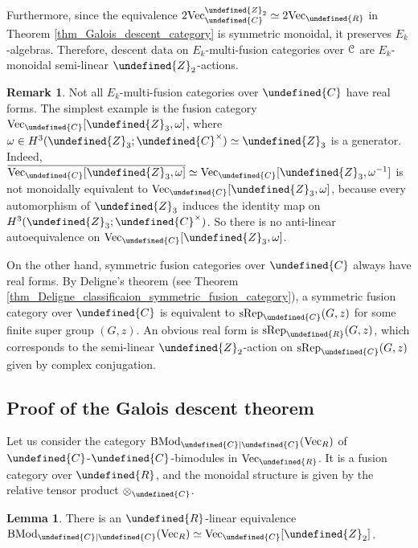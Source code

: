 \documentclass[10pt]{article}
\let\mathbb\undefined
\theoremstyle{definition}
\newtheorem{lem}[thm]{Lemma}
\newtheorem{rem}[thm]{Remark}
\numberwithin{equation}{section}
\numberwithin{thm}{section}
\newcommand{\Cb}{\mathbb{C}}
\newcommand{\Rb}{\mathbb{R}}
\newcommand{\Zb}{\mathbb{Z}}
\newcommand{\CC}{\EuScript{C}}
\DeclareMathOperator{\BMod}{BMod}
\newcommand{\vect}{\mathrm{Vec}}
\newcommand{\srep}{\mathrm{sRep}}
\begin{document}
Furthermore, since the equivalence $2\vect_\Cb^{\Zb_2} \simeq 2\vect_\Rb$ in Theorem \ref{thm_Galois_descent_category} is symmetric monoidal, it preserves $E_k$-algebras. Therefore, descent data on $E_k$-multi-fusion categories over $\CC$ are $E_k$-monoidal semi-linear $\Zb_2$-actions.

\begin{rem}
Not all $E_k$-multi-fusion categories over $\Cb$ have real forms. The simplest example is the fusion category $\vect_{\Cb}[\Zb_3,\omega]$, where $\omega \in H^3(\Zb_3;\Cb^\times) \simeq \Zb_3$ is a generator. Indeed, $\overline{\vect_{\Cb}[\Zb_3,\omega]} \simeq \vect_{\Cb}[\Zb_3,\omega^{-1}]$ is not monoidally equivalent to $\vect_{\Cb}[\Zb_3,\omega]$, because every automorphism of $\Zb_3$ induces the identity map on $H^3(\Zb_3;\Cb^\times)$. So there is no anti-linear autoequivalence on $\vect_{\Cb}[\Zb_3,\omega]$.

On the other hand, symmetric fusion categories over $\Cb$ always have real forms. By Deligne's theorem (see Theorem \ref{thm_Deligne_classificaion_symmetric_fusion_category}), a symmetric fusion category over $\Cb$ is equivalent to $\srep_\Cb(G,z)$ for some finite super group $(G,z)$. An obvious real form is $\srep_\Rb(G,z)$, which corresponds to the semi-linear $\Zb_2$-action on $\srep_\Cb(G,z)$ given by complex conjugation.
\end{rem}

\subsection{Proof of the Galois descent theorem}

Let us consider the category $\BMod_{\Cb|\Cb}(\vect_R)$ of $\Cb$-$\Cb$-bimodules in $\vect_\Rb$. It is a fusion category over $\Rb$, and the monoidal structure is given by the relative tensor product $\otimes_\Cb$.

\begin{lem} \label{lem_BMod_C_C_Vec_C_Z2}
There is an $\Rb$-linear equivalence $\BMod_{\Cb|\Cb}(\vect_R) \simeq \vect_\Cb[\Zb_2]$.
\end{lem}
\end{document}
